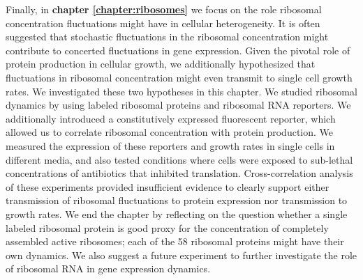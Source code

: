 Finally, in \textbf{chapter \ref{chapter:ribosomes}} we focus on the role ribosomal concentration fluctuations might have in cellular heterogeneity.
%
%
It is often suggested that stochastic fluctuations in the ribosomal concentration might 
contribute to concerted fluctuations in gene expression. 
%
Given the pivotal role of protein production in cellular growth, 
we additionally hypothesized that 
fluctuations in ribosomal concentration might even transmit to single cell growth rates.
We investigated these two hypotheses in this chapter.
We studied ribosomal dynamics by using labeled ribosomal proteins and ribosomal RNA reporters.
%
We additionally introduced 
a constitutively expressed fluorescent reporter, which allowed us to 
correlate ribosomal concentration with protein production.
%
We measured the expression of these reporters and growth rates in single cells in different media, 
and also tested conditions where cells were exposed to sub-lethal concentrations of antibiotics that inhibited translation.
%
Cross-correlation analysis of these experiments 
provided insufficient evidence to clearly support either 
transmission of ribosomal fluctuations to
protein expression
nor transmission to growth rates.
%
We end the chapter by reflecting on the question whether a single labeled ribosomal protein is good proxy for the concentration of 
completely assembled active ribosomes;
each of the 58 ribosomal proteins might have their own dynamics. 
%
We also suggest a future experiment to further investigate the role of ribosomal RNA in gene expression dynamics.



%






